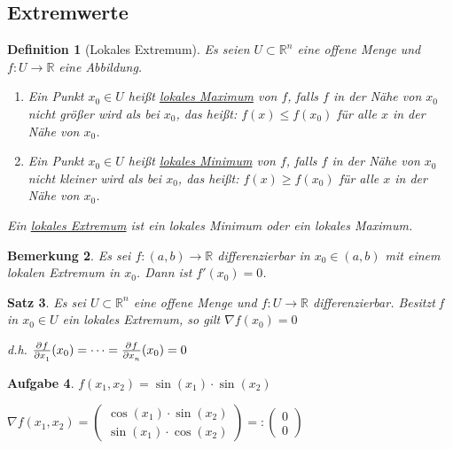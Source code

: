 \documentclass[fontset=ubuntu,11pt,a4paper,fleqn,headsepline]{scrreprt}
\newtheorem{defi}{Definition}[section]
\newtheorem{bemerkung}[defi]{Bemerkung}
\newtheorem{satz}[defi]{Satz}
\newtheorem{aufg}[defi]{Aufgabe}
\begin{document}
\begin{multicols}{2}
    \section*{Extremwerte}
    
    \begin{defi}[Lokales Extremum]
        Es seien \(U\subset\mathbb{R}^n\) eine offene Menge und \(f:U\to\mathbb{R}\) eine Abbildung.
        \begin{enumerate}[label=\emph{(\roman*)}]
            \item Ein Punkt \(x_0\in U\) heißt \underline{lokales Maximum} von \(f\), falls \(f\) in der Nähe von \(x_0\) nicht größer wird als bei \(x_0\), das heißt:
            \(f(x)\le f(x_0)\) für alle \(x\) in der Nähe von \(x_0\).
            \item Ein Punkt \(x_0\in U\) heißt \underline{lokales Minimum} von \(f\), falls \(f\) in der Nähe von \(x_0\) nicht kleiner wird als bei \(x_0\), das heißt:
            \(f(x)\ge f(x_0) \) für alle \(x\) in der Nähe von \(x_0\).
        \end{enumerate}
        Ein \underline{lokales Extremum} ist ein lokales Minimum oder ein lokales Maximum.
    \end{defi}
    
    \begin{bemerkung}
        Es sei \(f:(a,b)\to\mathbb{R}\) differenzierbar in \(x_0\in (a,b)\) mit einem lokalen Extremum in \(x_0\). Dann ist \(f'(x_0)=0\).
    \end{bemerkung}
    
    \begin{satz}
        Es sei \(U \subset \mathbb{R}^n\) eine offene Menge und \(f:U\to\mathbb{R}\) differenzierbar. Besitzt f in \(x_0\in U\) ein lokales Extremum, so gilt
        \underline{\(\nabla f(x_0)=0\)}

        d.h. \(\pd{f}{x_1}(x_0)=\cdots=\pd{f}{x_n}(x_0)=0\)
    \end{satz}
    
    \begin{aufg}
        \(f(x_1,x_2)=\sin(x_1)\cdot\sin(x_2)\)
    
        \(\nabla f(x_1,x_2)=\begin{pmatrix}
            \cos(x_1)\cdot\sin(x_2) \\
            \sin(x_1)\cdot\cos(x_2)
        \end{pmatrix} =: \begin{pmatrix}0 \\ 0\end{pmatrix}\)
    

\end{aufg}
\end{multicols}
\end{document}
